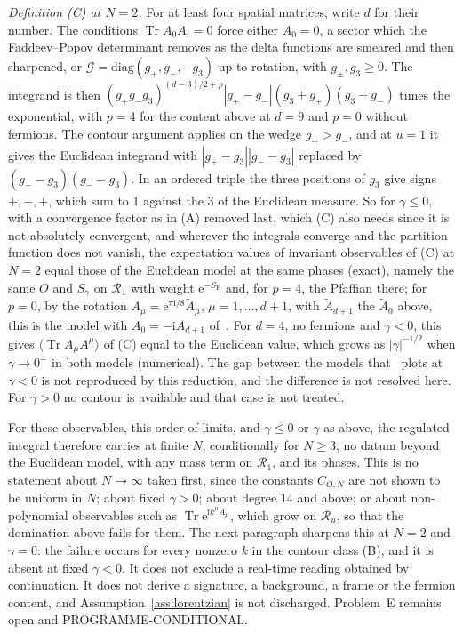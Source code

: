 \emph{Definition (C) at \(N=2\).} For at least four spatial matrices, write \(d\) for their number. The conditions \(\operatorname{Tr}A_0A_i=0\) force either \(A_0=0\), a sector which the Faddeev--Popov determinant removes as the delta functions are smeared and then sharpened, or \(\mathcal G=\mathrm{diag}(g_+,g_-,-g_3)\) up to rotation, with \(g_\pm,g_3\ge0\). The integrand is then \((g_+g_-g_3)^{(d-3)/2+p}|g_+-g_-|(g_3+g_+)(g_3+g_-)\) times the exponential, with \(p=4\) for the content above at \(d=9\) and \(p=0\) without fermions. The contour argument applies on the wedge \(g_+>g_-\), and at \(u=1\) it gives the Euclidean integrand with \(|g_+-g_3||g_--g_3|\) replaced by \((g_+-g_3)(g_--g_3)\). In an ordered triple the three positions of \(g_3\) give signs \(+,-,+\), which sum to \(1\) against the \(3\) of the Euclidean measure. So for \(\gamma\le0\), with a convergence factor as in (A) removed last, which (C) also needs since it is not absolutely convergent, and wherever the integrals converge and the partition function does not vanish, the expectation values of invariant observables of (C) at \(N=2\) equal those of the Euclidean model at the same phases (exact), namely the same \(O\) and \(S_\gamma\) on \(\mathcal R_1\) with weight \(\mathrm e^{-S_{\mathrm E}}\) and, for \(p=4\), the Pfaffian there; for \(p=0\), by the rotation \(A_\mu=\mathrm e^{\pi\mathrm i/8}\tilde A_\mu\), \(\mu=1,\dots,d+1\), with \(\tilde A_{d+1}\) the \(\tilde A_0\) above, this is the model with \(A_0=-\mathrm iA_{d+1}\) of~\cite{ChouNishimuraTripathi2025}. For \(d=4\), no fermions and \(\gamma<0\), this gives \(\langle\operatorname{Tr}A_\mu A^\mu\rangle\) of (C) equal to the Euclidean value, which grows as \(|\gamma|^{-1/2}\) when \(\gamma\to0^-\) in both models (numerical). The gap between the models that~\cite{ChouNishimuraTripathi2025} plots at \(\gamma<0\) is not reproduced by this reduction, and the difference is not resolved here. For \(\gamma>0\) no contour is available and that case is not treated.

For these observables, this order of limits, and \(\gamma\le0\) or \(\gamma\) as above, the regulated integral therefore carries at finite \(N\), conditionally for \(N\ge3\), no datum beyond the Euclidean model, with any mass term on \(\mathcal R_1\), and its phases. This is no statement about \(N\to\infty\) taken first, since the constants \(C_{O,N}\) are not shown to be uniform in \(N\); about fixed \(\gamma>0\); about degree \(14\) and above; or about non-polynomial observables such as \(\operatorname{Tr}\mathrm e^{\mathrm ik^\mu A_\mu}\), which grow on \(\mathcal R_u\), so that the domination above fails for them. The next paragraph sharpens this at \(N=2\) and \(\gamma=0\): the failure occurs for every nonzero \(k\) in the contour class (B), and it is absent at fixed \(\gamma<0\). It does not exclude a real-time reading obtained by continuation. It does not derive a signature, a background, a frame or the fermion content, and Assumption~\ref{ass:lorentzian} is not discharged. Problem~E remains open and PROGRAMME-CONDITIONAL.

